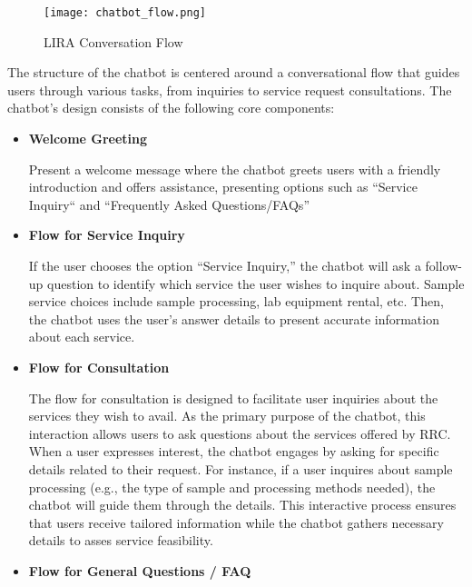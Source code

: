 \newpage

\begin{figure}[h]
	\centering 
	\texttt{[image: chatbot\_flow.png]}
	\caption{LIRA Conversation Flow}
	\label{fig:chatbot_flow}
\end{figure}

\newpage

The structure of the chatbot is centered around a conversational flow that guides users through various tasks, from inquiries to service request consultations. The chatbot’s design consists of the following core components:

\begin{itemize}
	\item \textbf{Welcome Greeting}
	
	Present a welcome message where the chatbot greets users with a friendly introduction and offers assistance, presenting options such as “Service Inquiry“ and “Frequently Asked Questions/FAQs” \newline
	
	\item \textbf{Flow for Service Inquiry}
	
	If the user chooses the option “Service Inquiry,” the chatbot will ask a follow-up question to identify which service the user wishes to inquire about. Sample service choices include sample processing,  lab equipment rental, etc. Then, the chatbot uses the user's answer details to present accurate information about each service. \newline
	
	\item \textbf{Flow for Consultation}
	
	The flow for consultation is designed to facilitate user inquiries about the services they wish to avail. As the primary purpose of the chatbot, this interaction allows users to ask questions about the services offered by RRC. When a user expresses interest, the chatbot engages by asking for specific details related to their request. For instance, if a user inquires about sample processing (e.g., the type of sample and processing methods needed), the chatbot will guide them through the details. This interactive process ensures that users receive tailored information while the chatbot gathers necessary details to asses service feasibility. \newline
	
	\item \textbf{Flow for General Questions / FAQ}
	

\end{itemize}
